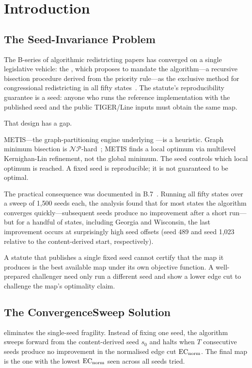 \section{Introduction}
\label{sec:introduction}

\subsection{The Seed-Invariance Problem}

The B-series of algorithmic redistricting papers has converged on a single
legislative vehicle: the \dia{}, which proposes to mandate the \ar{}
algorithm---a recursive bisection procedure derived from the \hh{} priority
rule---as the exclusive method for congressional redistricting in all fifty
states~\citep{b02paper}.
The statute's reproducibility guarantee is a seed: anyone who runs the
reference implementation with the published seed and the public TIGER/Line
inputs must obtain the same map.

That design has a gap.

METIS---the graph-partitioning engine underlying \ar{}---is a heuristic.
Graph minimum bisection is $\mathcal{NP}$-hard~\citep{b6paper}; METIS finds a
local optimum via multilevel Kernighan-Lin refinement, not the global minimum.
The seed controls which local optimum is reached.
A fixed seed is reproducible; it is not guaranteed to be optimal.

The practical consequence was documented in B.7~\citep{b7paper}.
Running all fifty states over a sweep of 1{,}500 seeds each, the analysis
found that for most states the algorithm converges quickly---subsequent seeds
produce no improvement after a short run---but for a handful of states,
including Georgia and Wisconsin, the last improvement occurs at surprisingly
high seed offsets (seed 489 and seed 1{,}023 relative to the content-derived
start, respectively).

A statute that publishes a single fixed seed cannot certify that the map it
produces is the best available map under its own objective function.
A well-prepared challenger need only run a different seed and show a
lower edge cut to challenge the map's optimality claim.

\subsection{The ConvergenceSweep Solution}

\cs{} eliminates the single-seed fragility.
Instead of fixing one seed, the algorithm sweeps forward from the
content-derived seed $s_0$ and halts when $T$ consecutive seeds produce no
improvement in the normalised edge cut $\mathrm{EC}_{\mathrm{norm}}$.
The final map is the one with the lowest $\mathrm{EC}_{\mathrm{norm}}$ seen across all seeds tried.

